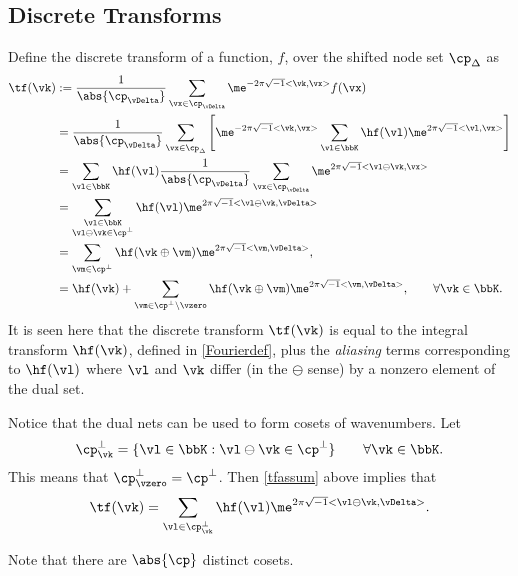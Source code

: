 \documentclass[]{elsarticle}
\theoremstyle{definition}
\theoremstyle{remark}
\begin{document}
\subsection{Discrete Transforms}
Define the discrete transform of a function, $f$, over the shifted node set $\cp_{\Delta}$ as
\begin{align}
\label{tfdef}
\tf(\vk)
&:= \frac{1}{\abs{\cp_{\vDelta}}} \sum_{\vx \in \cp_{\vDelta}} \me^{-2 \pi \sqrt{-1} <\vk , \vx>} f(\vx) \\
\nonumber
&= \frac{1}{\abs{\cp_{\vDelta}}} \sum_{\vx \in \cp_{\Delta}} \left[\me^{-2 \pi \sqrt{-1} <\vk , \vx>}\sum_{\vl \in \bbK} \hf(\vl) \me^{2 \pi \sqrt{-1} <\vl , \vx>} \right] \\
\nonumber
& = \sum_{\vl \in \bbK} \hf(\vl)  \frac{1}{\abs{\cp_{\vDelta}}} \sum_{\vx \in \cp_{\vDelta}}  \me^{2 \pi \sqrt{-1} <\vl \ominus \vk , \vx>} \\
\nonumber
& = \sum_{\substack{\vl \in \bbK \\ \vl \ominus \vk \in \cp^{\perp}}} \hf(\vl) \me^{2 \pi \sqrt{-1} <\vl \ominus \vk , \vDelta>} \\
\nonumber
&= \sum_{\vm \in \cp^{\perp}} \hf(\vk\oplus\vm) \me^{2 \pi \sqrt{-1} <\vm , \vDelta>}, \\
&= \hf(\vk) + \sum_{\vm \in \cp^{\perp}\setminus \vzero} \hf(\vk\oplus\vm) \me^{2 \pi \sqrt{-1} <\vm , \vDelta>}, \qquad \forall \vk \in \bbK. \label{tfassum}
\end{align}
It is seen here that the discrete transform $\tf(\vk)$ is equal to the integral transform $\hf(\vk)$, defined in \eqref{Fourierdef}, plus the \emph{aliasing} terms corresponding to $\hf(\vl)$ where $\vl$ and $\vk$ differ (in the $\ominus$ sense) by a nonzero element of the dual set.

Notice that the dual nets can be used to form cosets of wavenumbers.  Let
\begin{equation*}
\cp^{\perp}_{\vk} = \{ \vl \in \bbK : \vl \ominus \vk \in \cp^{\perp}\} \qquad \forall \vk \in \bbK.
\end{equation*}
This means that $\cp^{\perp}_{\vzero}=\cp^{\perp}$.  Then \eqref{tfassum} above implies that
\begin{equation}
\label{tfassumb}
\tf(\vk) = \sum_{\vl \in \cp^{\perp}_{\vk}} \hf(\vl) \me^{2 \pi \sqrt{-1} <\vl \ominus \vk , \vDelta>}.
\end{equation}

Note that there are $\abs{\cp}$ distinct cosets.
\end{document}
